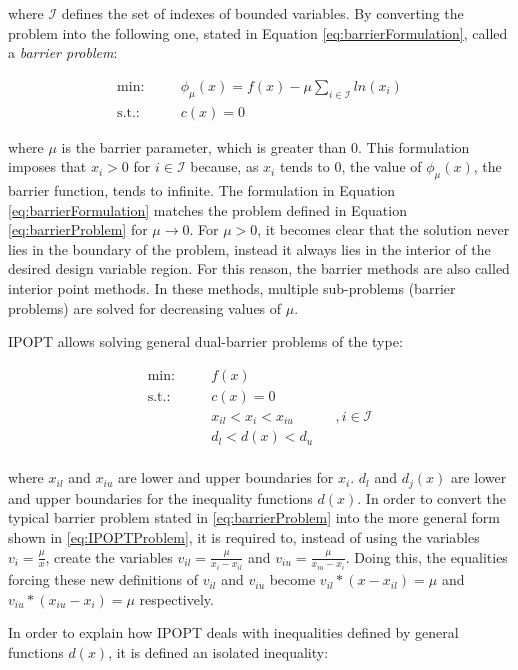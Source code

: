 where $\mathcal{I}$ defines the set of indexes of bounded variables.
By converting the problem into the following one, stated in Equation \ref{eq:barrierFormulation}, called a \textit{barrier problem}:

\begin{equation}
    \begin{matrix}
    \text{min:} && \quad \phi_\mu (x) = f(x) - \mu \sum_{i \in \mathcal{I}} ln(x_i) \\
    \text{s.t.:} && \quad c(x)=0
    \end{matrix}
    \label{eq:barrierFormulation}
\end{equation}

where $\mu$ is the barrier parameter, which is greater than 0. This formulation imposes that $ x_i > 0$ for $ i \in \mathcal{I}$ because, as $x_i$ tends to 0, the value of $\phi_\mu (x)$, the barrier function, tends to infinite. The formulation in Equation \ref{eq:barrierFormulation} matches the problem defined in Equation \ref{eq:barrierProblem} for $\mu \rightarrow 0$. For $\mu > 0$, it becomes clear that the solution never lies in the boundary of the problem, instead it always lies in the interior of the desired design variable region. For this reason, the barrier methods are also called interior point methods. In these methods, multiple sub-problems (barrier problems) are solved for decreasing values of $\mu$. 
\par
IPOPT allows solving general dual-barrier problems of the type:

\begin{equation}
    \begin{matrix}
    \text{min:} && \quad f(x) && \\
    \text{s.t.:} && \quad c(x) = 0 && \\
     && \quad  x_{i l} < x_i < x_{i u} && , i \in \mathcal{I} \\
     && \quad  d_{l} < d(x) < d_{u} && \\
    \end{matrix}
    \label{eq:IPOPTProblem}
\end{equation}

where $x_{i l}$ and $x_{i u}$ are lower and upper boundaries for $x_i$. $d_{l}$ and $d_j(x)$ are lower and upper boundaries for the inequality functions $d(x)$. In order to convert the typical barrier problem stated in \ref{eq:barrierProblem} into the more general form shown in \ref{eq:IPOPTProblem}, it is required to, instead of using the variables $v_i=\frac{\mu}{x}$, create  the variables $v_{i l}= \frac{\mu}{x_i-x_{i l}}$ and $v_{i u}= \frac{\mu}{x_{i u}-x_{i}}$. Doing this,  the equalities forcing these new definitions of $v_{ i l}$ and $v_{i u}$ become $v_{ i l} * (x-x_{i l})=\mu$ and $v_{ i u} * (x_{i u}-x_i)=\mu$ respectively.
\par
In order to explain how IPOPT deals with inequalities defined by general functions $d(x)$, it is defined an isolated inequality:

